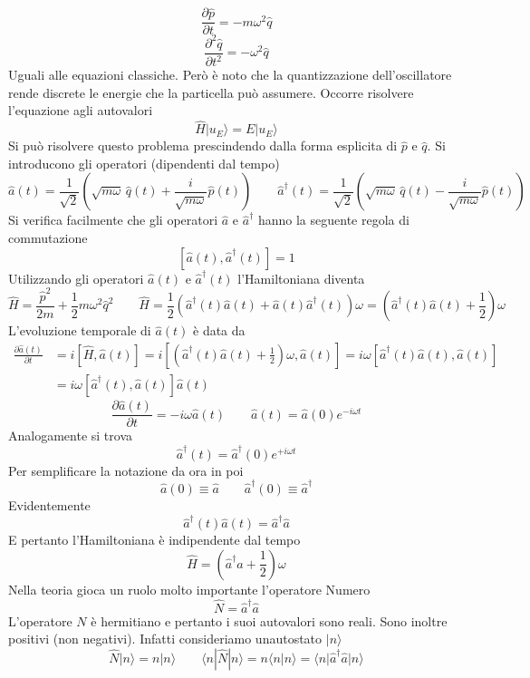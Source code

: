 $$
\frac{\partial\hat{p}}{\partial t} = -m\omega^2\hat{q}
$$
$$
\frac{\partial^2\hat{q}}{\partial t^2} = -\omega^2\hat{q}
$$
Uguali alle equazioni classiche. Però è noto che la quantizzazione dell'oscillatore rende discrete le energie che la particella può assumere. Occorre risolvere l'equazione agli autovalori
$$
\hat{H} |u_E\rangle = E |u_E\rangle
$$
Si può risolvere questo problema prescindendo dalla forma esplicita di $\hat{p}$ e $\hat{q}$. Si introducono gli operatori (dipendenti dal tempo)
$$
\hat{a}(t) = \frac{1}{\sqrt{2}} \left( \sqrt{m\omega} \, \hat{q}(t) + \frac{i}{\sqrt{m\omega}} \hat{p}(t) \right) \qquad \hat{a}^\dagger(t) = \frac{1}{\sqrt{2}} \left( \sqrt{m\omega} \, \hat{q}(t) - \frac{i}{\sqrt{m\omega}} \hat{p}(t) \right)
$$
Si verifica facilmente che gli operatori $\hat{a}$ e $\hat{a}^\dagger$ hanno la seguente regola di commutazione
$$
[\hat{a}(t), \hat{a}^\dagger(t)] = 1
$$
Utilizzando gli operatori $\hat{a}(t)$ e $\hat{a}^\dagger(t)$ l'Hamiltoniana diventa
$$
\hat{H} = \frac{\hat{p}^2}{2m} + \frac{1}{2}m\omega^2 \hat{q}^2 \qquad \hat{H} = \frac{1}{2} (\hat{a}^\dagger(t)\hat{a}(t) + \hat{a}(t)\hat{a}^\dagger(t)) \omega = \left( \hat{a}^\dagger(t)\hat{a}(t) + \frac{1}{2} \right) \omega
$$
L'evoluzione temporale di $\hat{a}(t)$ è data da
\begin{align*}
\frac{\partial \hat{a}(t)}{\partial t} &= i[\hat{H}, \hat{a}(t)] = i\left[ \left( \hat{a}^\dagger(t)\hat{a}(t) + \frac{1}{2} \right)\omega, \hat{a}(t) \right] = i\omega [\hat{a}^\dagger(t)\hat{a}(t), \hat{a}(t)] \\
&= i\omega [\hat{a}^\dagger(t), \hat{a}(t)] \hat{a}(t)
\end{align*}
$$
\frac{\partial \hat{a}(t)}{\partial t} = -i\omega \hat{a}(t) \qquad \hat{a}(t) = \hat{a}(0) e^{-i\omega t}
$$
Analogamente si trova
$$
\hat{a}^\dagger(t) = \hat{a}^\dagger(0) e^{+i\omega t}
$$
Per semplificare la notazione da ora in poi
$$
\hat{a}(0) \equiv \hat{a} \qquad \hat{a}^\dagger(0) \equiv \hat{a}^\dagger
$$
Evidentemente
$$
\hat{a}^\dagger(t)\hat{a}(t) = \hat{a}^\dagger\hat{a}
$$
E pertanto l'Hamiltoniana è indipendente dal tempo
$$
\hat{H} = \left( \hat{a}^\dagger \hat{a} + \frac{1}{2} \right) \omega
$$
Nella teoria gioca un ruolo molto importante l'operatore Numero
$$
\hat{N} = \hat{a}^\dagger \hat{a}
$$
L'operatore $N$ è hermitiano e pertanto i suoi autovalori sono reali. Sono inoltre positivi (non negativi). Infatti consideriamo unautostato $|n\rangle$
$$
\hat{N} |n\rangle = n |n\rangle \qquad \langle n | \hat{N} | n \rangle = n \langle n | n \rangle = \langle n | \hat{a}^\dagger \hat{a} | n \rangle
$$

